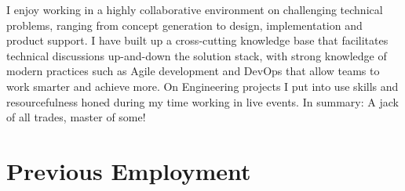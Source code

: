 \documentclass[]{deedy-resume-openfont-wjl}
\begin{document}
%
%


%
%

I enjoy working in a highly collaborative environment on challenging technical problems, ranging from concept generation to design, implementation and product support.
I have built up a cross-cutting knowledge base that facilitates technical discussions up-and-down the solution stack, with strong knowledge of modern practices such as Agile development and DevOps that allow teams to work smarter and achieve more.
On Engineering projects I put into use skills and resourcefulness honed during my time working in live events.
In summary: A jack of all trades, master of some!

%
%
\sectionsep
\section{Previous Employment}










\end{document}
